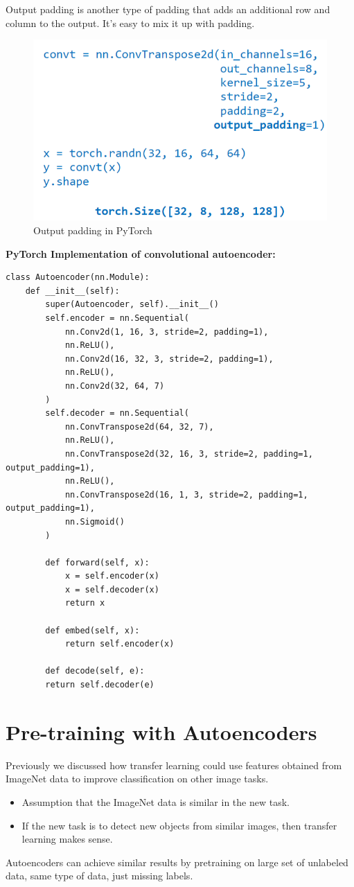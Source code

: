 Output padding is another type of padding that adds an additional row and column to the output. It's easy to mix it up with padding.

\begin{figure}[h!t]
    \centering
    \includegraphics[width=0.35\linewidth]{outputpaddingtconv.png}
    \caption{Output padding in PyTorch}
    \label{fig:enter-label}
\end{figure}


\begin{idea}
    \textbf{PyTorch Implementation of convolutional autoencoder:}

\begin{verbatim}
class Autoencoder(nn.Module):
    def __init__(self):
        super(Autoencoder, self).__init__()
        self.encoder = nn.Sequential(
            nn.Conv2d(1, 16, 3, stride=2, padding=1),
            nn.ReLU(),
            nn.Conv2d(16, 32, 3, stride=2, padding=1),
            nn.ReLU(),
            nn.Conv2d(32, 64, 7)
        )
        self.decoder = nn.Sequential(
            nn.ConvTranspose2d(64, 32, 7),
            nn.ReLU(),
            nn.ConvTranspose2d(32, 16, 3, stride=2, padding=1, output_padding=1),
            nn.ReLU(),
            nn.ConvTranspose2d(16, 1, 3, stride=2, padding=1, output_padding=1),
            nn.Sigmoid()
        )

        def forward(self, x):
            x = self.encoder(x)
            x = self.decoder(x)
            return x

        def embed(self, x):
            return self.encoder(x)

        def decode(self, e):
        return self.decoder(e)
\end{verbatim}
\end{idea}

\section{Pre-training with Autoencoders}

Previously we discussed how transfer learning could use features obtained from ImageNet data to improve classification on other image tasks.
\begin{itemize}
    \item Assumption that the ImageNet data is similar in the new task.
    \item If the new task is to detect new objects from similar images, then transfer learning makes sense.
\end{itemize}
Autoencoders can achieve similar results by pretraining on large set of unlabeled data, same type of data, just missing labels.

